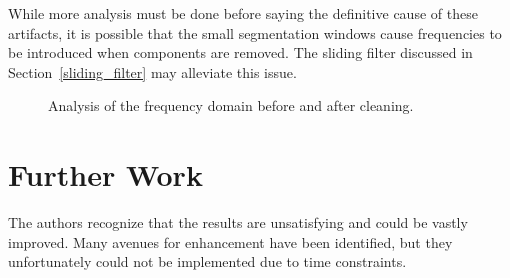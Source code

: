 \documentclass{acm_proc_article-sp}
\begin{document}
While more analysis must be done before saying the definitive cause of
these artifacts, it is possible that the small segmentation windows
cause frequencies to be introduced when components are removed. The
sliding filter discussed in Section~\ref{sliding_filter} may alleviate
this issue.
\begin{figure}
  \hfill
  \caption{Analysis of the frequency domain before and after cleaning.}\label{fig:ResultsPSD}
\end{figure}


\section{Further Work}\label{future_work}
The authors recognize that the results are unsatisfying and could be
vastly improved. Many avenues for enhancement have been identified,
but they unfortunately could not be implemented due to time
constraints.
\end{document}
